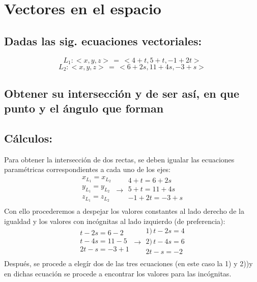 \documentclass[letterpaper, 12pt]{article}
\begin{document}
    
\setcounter{page}{1}
\thispagestyle{fancy}
\section{Vectores en el espacio}
\subsection*{Dadas las sig. ecuaciones vectoriales:}
\[L_1: <\!x,y,z\!>\,=\,<\!4+t,5+t,-1+2t\!>\]
\[L_2: <\!x,y,z\!>\,=\,<\!6+2s,11+4s,-3+s\!>\]
\subsection*{Obtener su intersección y de ser así, en que punto y el ángulo que forman}
\subsection*{Cálculos:}
Para obtener la intersección de dos rectas, se deben igualar las ecuaciones paramétricas correspondientes a cada uno de los ejes:
\[ \begin{matrix}
    x_{L_1}=x_{L_2}\\
    y_{L_1}=y_{L_2}\\
    z_{L_1}=z_{L_2}\\
\end{matrix}\rightarrow\begin{matrix}
    4+t=6+2s\\
    5+t=11+4s\\
    -1+2t=-3+s\\
\end{matrix}\]
Con ello procederemos a despejar los valores constantes al lado derecho de la igualdad y los valores con incógnitas al lado izquierdo (de preferencia):
\[\begin{matrix}
    t-2s=6-2\\
    t-4s=11-5\\
    2t-s=-3+1\\
\end{matrix}\rightarrow\begin{matrix}
   \text{1)}\,t-2s=4\\
    \text{2)}\,t-4s=6\\
    2t-s=-2\\
\end{matrix}\] 
Después, se procede a elegír dos de las tres ecuaciones (en este caso la 1) y 2))y en dichas ecuación se procede a encontrar los valores para las incógnitas.
\end{document}
